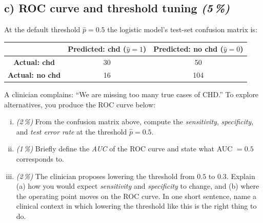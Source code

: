 \documentclass[11pt,a4paper]{article}
\newcommand{\subpoints}[1]{\textit{(#1\,\%)}}
\begin{document}
\subsection*{c) ROC curve and threshold tuning \subpoints{5}}

At the default threshold $\hat p = 0.5$ the logistic model's test-set confusion matrix is:
\begin{center}\small
\begin{tabular}{c|cc}
 & \textbf{Predicted: chd ($\hat y = 1$)} & \textbf{Predicted: no chd ($\hat y = 0$)} \\ \hline
\textbf{Actual: chd}    & 30   & 50  \\
\textbf{Actual: no chd} & 16   & 104 \\
\end{tabular}
\end{center}

A clinician complains: ``We are missing too many true cases of CHD.'' To explore alternatives, you produce the ROC curve below:
\begin{center}
\end{center}

\begin{enumerate}[(i)]
  \item \subpoints{2} From the confusion matrix above, compute the \emph{sensitivity}, \emph{specificity}, and \emph{test error rate} at the threshold $\hat p = 0.5$.
  \item \subpoints{1} Briefly define the \emph{AUC} of the ROC curve and state what AUC $= 0.5$ corresponds to.
  \item \subpoints{2} The clinician proposes lowering the threshold from $0.5$ to $0.3$. Explain (a) how you would expect \emph{sensitivity} and \emph{specificity} to change, and (b) where the operating point moves on the ROC curve. In one short sentence, name a clinical context in which lowering the threshold like this is the right thing to do.
\end{enumerate}
\end{document}

